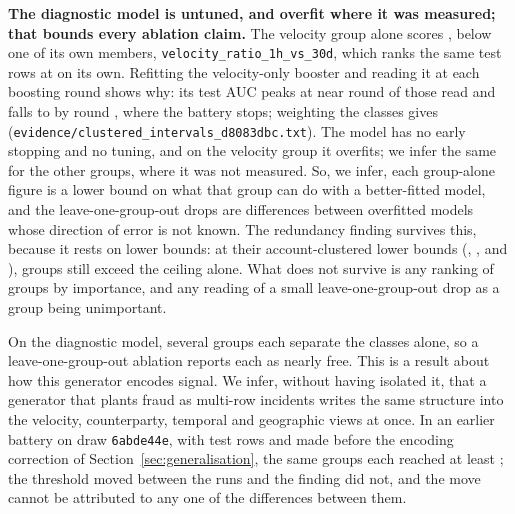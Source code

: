 \textbf{The diagnostic model is untuned, and overfit where it was measured; that bounds every
ablation claim.} The velocity group alone scores \nGroupVelocity{}, below one of its own members,
\texttt{velocity\_ratio\_1h\_vs\_30d}, which ranks the same test rows at \nVelRatioAlone{} on its
own. Refitting the velocity-only booster and reading it at each boosting round shows why: its test
AUC peaks at \nVelPeak{} near round \nVelPeakRound{} of those read and falls to \nVelAtRounds{} by
round \nVelRounds{}, where the battery stops; weighting the classes gives \nVelWeightedAtRounds{}
(\texttt{evidence/\allowbreak clustered\_\allowbreak intervals\_\allowbreak d8083dbc.txt}). The
model has no early stopping and no tuning, and on the velocity group it overfits; we infer the same
for the other groups, where it was not measured. So, we infer, each group-alone figure is a lower
bound on what that group can do with a better-fitted model, and the leave-one-group-out drops are
differences between overfitted models whose direction of error is not known. The redundancy finding
survives this, because it rests on lower bounds: at their account-clustered lower bounds
(\nCluCounterpartyLow{}, \nCluVelocityLow{}, \nCluTemporalLow{} and \nCluGeographicLow{}),
\nGroupsAboveCeilingClu{} groups still exceed the \nCeiling{} ceiling alone. What does not survive is
any ranking of groups by importance, and any reading of a small leave-one-group-out drop as a group
being unimportant.

On the diagnostic model, several groups each separate the classes alone, so a
leave-one-group-out ablation reports each as nearly free. This is a result about how this generator
encodes signal. We infer, without having isolated it, that a generator that plants fraud as
multi-row incidents writes the same structure into the velocity, counterparty, temporal and
geographic views at once. In an earlier battery on draw \texttt{6abde44e}, with
\nEarlyHeldOutRows{} test rows and made before the encoding correction of
Section~\ref{sec:generalisation}, the same groups each reached at least \nEarlyGroupMin{}; the
threshold moved between the runs and the finding did not, and the move cannot be attributed to any
one of the differences between them.

